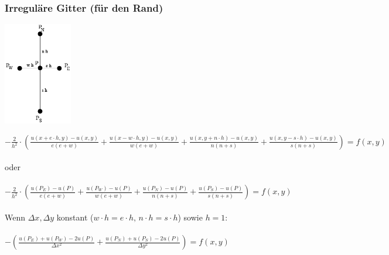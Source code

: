 \subsubsection{Irreguläre Gitter (für den Rand)}
\begin{minipage}{3cm}
	\includegraphics[width=3cm]{Content/Numerik/irregulaereGitter.png}

\end{minipage}
\hfill
\begin{minipage}{14cm}

$- \frac{2}{h^2} \cdot \left(\frac{u(x+e \cdot h,y)-u(x,y)}{e(e+w)} +\frac{u(x-w \cdot h,y)-u(x,y)}{w(e+w)}+\frac{u(x,y+n \cdot h)-u(x,y)}{n(n+s)} + \frac{u(x,y-s \cdot h)-u(x,y)}{s(n+s)}\right)=f(x,y)$\\
\\
oder\\
\\
$- \frac{2}{h^2} \cdot \left(\frac{u(P_E) - u(P)}{e(e+w)} + \frac{u(P_W) - u(P)}{w(e+w)} + \frac{u(P_N) - u(P)}{n(n+s)} + \frac{u(P_S) - u(P)}{s(n+s)}\right) = f(x,y)$\\
\\
Wenn $\Delta x, \Delta y$ konstant ($w \cdot h = e \cdot h,\, n \cdot h = s \cdot h$) sowie $h=1$:\\
\\
$-\left(\frac{u(P_E) + u(P_W) - 2 u(P)}{\Delta x^2} + \frac{u(P_N) + u(P_S) - 2 u(P)}{\Delta y^2}\right) = f(x,y)$\\

\end{minipage}
